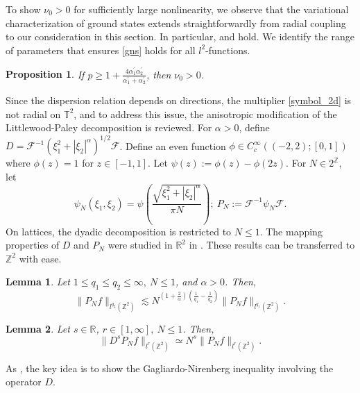 \documentclass{article}
\numberwithin{equation}{section}
\newtheorem{lemma}{Lemma}[section]
\newtheorem{proposition}{Proposition}[section]
\begin{document}
To show $\nu_0 > 0$ for sufficiently large nonlinearity, we observe that the variational characterization of ground states extends straightforwardly from radial coupling to our consideration in this section. In particular,  and  hold. We identify the range of parameters that ensures \eqref{gns} holds for all $l^2$-functions.
\begin{proposition}\label{p3}
    If $p \geq 1 + \frac{4\alpha_1^\prime\alpha_2^\prime}{\alpha_1^\prime + \alpha_2^\prime}$, then $\nu_0 > 0$. 
\end{proposition}
Since the dispersion relation depends on directions, the multiplier \eqref{symbol_2d} is not radial on $\mathbb{T}^2$, and to address this issue, the anisotropic modification of the Littlewood-Paley decomposition is reviewed. For $\alpha > 0$, define $D = \mathcal{F}^{-1}(\xi_1^2 + |\xi_2|^\alpha)^{1/2}\mathcal{F}$. Define an even function $\phi \in C^\infty_c((-2,2);[0,1])$ where $\phi(z) = 1$ for $z \in [-1,1]$. Let $\psi(z) := \phi(z)-\phi(2z)$. For $N \in 2^\mathbb{Z}$, let 
\begin{equation*}
    \psi_N(\xi_1,\xi_2) = \psi\left(\frac{\sqrt{\xi_1^2+|\xi_2|^\alpha}}{\pi N}\right);\ P_N := \mathcal{F}^{-1}\psi_N \mathcal{F}.
\end{equation*}
On lattices, the dyadic decomposition is restricted to $N \leq 1$. The mapping properties of $D$ and $P_N$ were studied in $\mathbb{R}^2$ in \cite[Lemma 3.1, 3.3]{CHOI2022100406}. These results can be transferred to $\mathbb{Z}^2$ with ease.
\begin{lemma}\label{Bernstein}
Let $1 \leq q_1 \leq q_2 \leq \infty,\ N \leq 1$, and $\alpha > 0$. Then,
\begin{equation*}
\| P_N f \|_{l^{q_2}(\mathbb{Z}^2)} \lesssim N^{(1+\frac{2}{\alpha})(\frac{1}{q_1}-\frac{1}{q_2})} \| P_N f \|_{l^{q_1}(\mathbb{Z}^2)}.    
\end{equation*}
\end{lemma}
\begin{lemma}\label{Bernstein2}
Let $s \in \mathbb{R}$, $r \in [1,\infty],\ N \leq 1$. Then,
\begin{equation*}
    \| D^{s} P_N f \|_{l^r(\mathbb{Z}^2)} \simeq N^s \| P_N f \|_{l^r(\mathbb{Z}^2)}.
\end{equation*}
\end{lemma}

As , the key idea is to show the Gagliardo-Nirenberg inequality involving the operator $D$.
\end{document}
